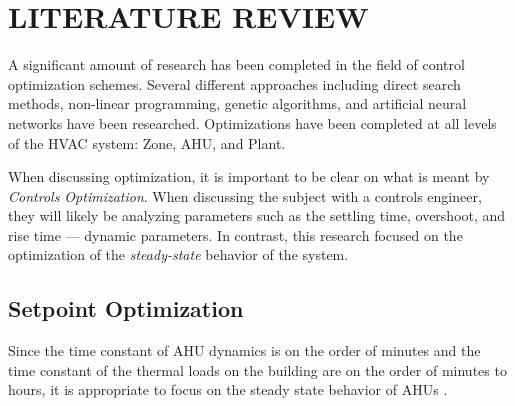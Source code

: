 %
%
%

\chapter{\texorpdfstring{\MakeUppercase{Literature Review}}{Literature Review}}


A significant amount of research has been completed in the field of
control optimization schemes. Several different approaches including
direct search methods, non-linear programming, genetic algorithms, and
artificial neural networks have been researched. Optimizations have been
completed at all levels of the HVAC system: Zone, AHU, and Plant.  

When discussing optimization, it is important to be clear on what is
meant by \textit{Controls Optimization}. When discussing the subject
with a controls engineer, they will likely be analyzing parameters such
as the settling time, overshoot, and rise time --- dynamic parameters.
In contrast, this research focused on the optimization of the
\textit{steady-state} behavior of the system. 





\section{Setpoint Optimization}

Since the time constant of AHU dynamics is on the order of minutes and
the time constant of the thermal loads on the building are on the order
of minutes to hours, it is appropriate to focus on the steady state
behavior of AHUs \cite{Bourdouxhe1998}.

